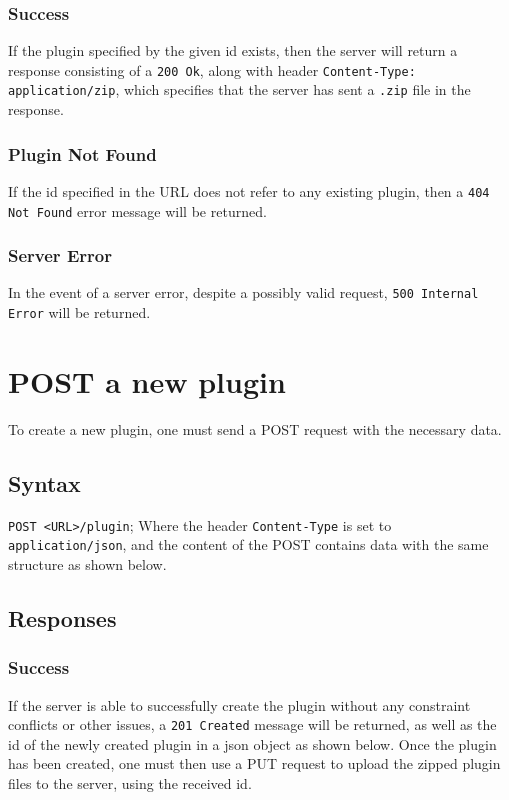 \documentclass[a4paper, 12pt]{article}
\begin{document}
			\subsubsection{Success}
				If the plugin specified by the given id exists, then the server will return a response consisting of a \verb|200 Ok|, along with header \verb|Content-Type: application/zip|, which specifies that the server has sent a \verb|.zip| file in the response.

			\subsubsection{Plugin Not Found}
				If the id specified in the URL does not refer to any existing plugin, then a \verb|404 Not Found| error message will be returned.

			\subsubsection{Server Error}
				In the event of a server error, despite a possibly valid request, \verb|500 Internal Error| will be returned.

	\section{POST a new plugin}
		To create a new plugin, one must send a POST request with the necessary data.

		\subsection{Syntax}
			\verb|POST <URL>/plugin|; \footnotesize{Where the header \verb|Content-Type| is set to \verb|application/json|, and the content of the POST contains data with the same structure as shown below.}

			

		\subsection{Responses}
			\subsubsection{Success}
				If the server is able to successfully create the plugin without any constraint conflicts or other issues, a \verb|201 Created| message will be returned, as well as the id of the newly created plugin in a json object as shown below. Once the plugin has been created, one must then use a PUT request to upload the zipped plugin files to the server, using the received id.
\end{document}
